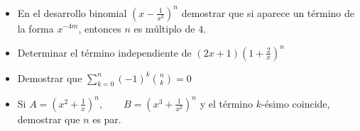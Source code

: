 \begin{Ejer}

\begin{itemize} Resolver los siguientes ejercicios:

\item[a) ] En el desarrollo binomial $\left(x-\frac{1}{x^3}\right)^n$ demostrar que si aparece un t\'ermino de la forma $x^{-4m}$, entonces $n$ es m\'ultiplo de $4$.

\item[b) ] Determinar el t\'ermino independiente de $(2x+1)\left(1+\frac{2}{x}\right)^n$

\item[c) ] Demostrar que $\sum_{k=0}^{n}(-1)^k\binom{n}{k}=0$

\item[d) ] Si $A=(x^2+\frac{1}{x})^n,\qquad B=(x^3+\frac{1}{x^2})^n$ y el t\'ermino $k$-\'esimo coincide, demostrar que $n$ es par.

\end{itemize}
\end{Ejer}

